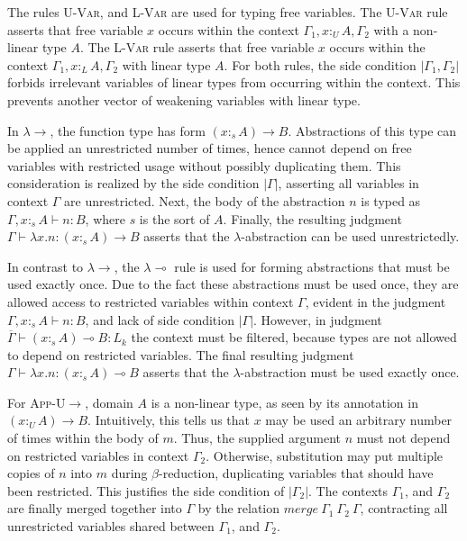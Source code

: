 \documentclass[sigplan,screen,review,anonymous]{acmart}
\newcommand{\rname}[1]{\textsc{\footnotesize #1}}
\newcommand{\pure}[1]{|#1|}
\newcommand{\utype}{:_{\scriptscriptstyle U}}
\newcommand{\ltype}{:_{\scriptscriptstyle L}}
\newcommand{\stype}[1]{:_#1}
\newcommand{\mrg}[3]{merge\ {#1}\ {#2}\ {#3}}
\begin{document}
The rules \rname{U-Var}, and \rname{L-Var} are used for typing free variables. The \rname{U-Var} rule asserts that free variable $x$ occurs within the context $\Gamma_1, x \utype A, \Gamma_2$ with a non-linear type $A$. The \rname{L-Var} rule asserts that free variable $x$ occurs within the context $\Gamma_1, x \ltype A, \Gamma_2$ with linear type $A$. For both rules, the side condition $\pure{\Gamma_1, \Gamma_2}$ forbids irrelevant variables of linear types from occurring within the context. This prevents another vector of weakening variables with linear type.

In \rname{$\lambda$$\rightarrow$}, the function type has form $(x \stype{s} A) \rightarrow B$. Abstractions of this type can be applied an unrestricted number of times, hence cannot depend on free variables with restricted usage without possibly duplicating them. This consideration is realized by the side condition $\pure{\Gamma}$, asserting all variables in context $\Gamma$ are unrestricted. Next, the body of the abstraction $n$ is typed as $\Gamma, x \stype{s} A \vdash n : B$, where $s$ is the sort of $A$. Finally, the resulting judgment $\Gamma \vdash \lambda x.n : (x \stype{s} A) \rightarrow B$ asserts that the $\lambda$-abstraction can be used unrestrictedly.

In contrast to \rname{$\lambda$$\rightarrow$}, the \rname{$\lambda$$\multimap$} rule is used for forming abstractions that must be used exactly once. Due to the fact these abstractions must be used once, they are allowed access to restricted variables within context $\Gamma$, evident in the judgment $\Gamma, x \stype{s} A \vdash n : B$, and lack of side condition $\pure{\Gamma}$. However, in judgment $\overline{\Gamma} \vdash (x \stype{s} A) \multimap B : L_k$ the context must be filtered, because types are not allowed to depend on restricted variables. The final resulting judgment $\Gamma \vdash \lambda x.n : (x \stype{s} A) \multimap B$ asserts that the $\lambda$-abstraction must be used exactly once.

For \rname{App-U$\rightarrow$}, domain $A$ is a non-linear type, as seen by its annotation in $(x \utype A) \rightarrow B$. Intuitively, this tells us that $x$ may be used an arbitrary number of times within the body of $m$. Thus, the supplied argument $n$ must not depend on restricted variables in context $\Gamma_2$. Otherwise, substitution may put multiple copies of $n$ into $m$ during $\beta$-reduction, duplicating variables that should have been restricted. This justifies the side condition of $\pure{\Gamma_2}$. The contexts $\Gamma_1$, and $\Gamma_2$ are finally merged together into $\Gamma$ by the relation $\mrg{\Gamma_1}{\Gamma_2}{\Gamma}$, contracting all unrestricted variables shared between $\Gamma_1$, and $\Gamma_2$.
\end{document}
